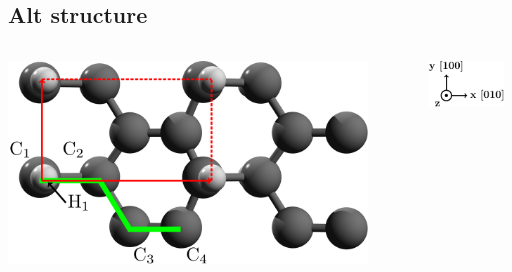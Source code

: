 \documentclass{beamer}
\begin{document}


\subsection{Alt structure}


\begin{frame}

\vspace{-3mm}
\begin{columns}

\flushright
\includegraphics[width=0.9\textwidth]{figs/alt1.pdf}

\vspace{5mm}

\flushleft
\includegraphics[width=0.9\textwidth]{figs/arrows1.pdf}

\end{columns}

\vspace{-5mm}

\begin{columns}


\end{columns}
\end{frame}
\end{document}
